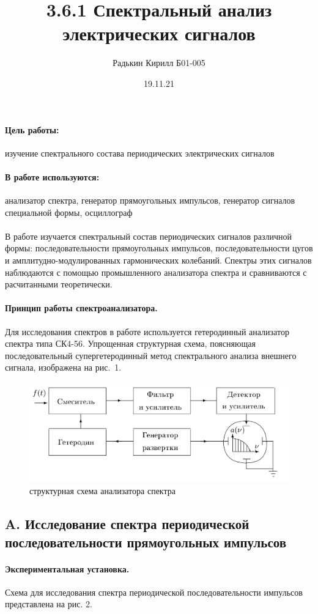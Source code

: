 \documentclass[a4paper, 12pt]{article}
\author{Радькин Кирилл Б01-005}
\title{3.6.1 Спектральный анализ электрических сигналов}
\date{19.11.21}
\newcommand{\parag}[1]{\paragraph*{#1:}}
\newcommand{\mysec}[1]{\begin{center}\section*{#1}\end{center}}
\begin{document}
    \maketitle

    \parag{Цель работы} изучение спектрального состава периодических электрических сигналов

    \parag{В работе используются} анализатор спектра, генератор прямоугольных импульсов, генератор сигналов специальной формы, осциллограф
    \\\\
    В работе изучается спектральный состав периодических сигналов различной формы: последовательности прямоугольных импульсов, последовательности цугов и амплитудно-модулированных гармонических колебаний. Спектры этих сигналов наблюдаются с помощью промышленного анализатора спектра и сравниваются с расчитанными теоретически.

    \paragraph*{Принцип работы спектроанализатора.} 
    Для исследования спектров в работе используется гетеродинный анализатор спектра типа СК4-56. Упрощенная структурная схема, поясняющая последовательный супергетеродинный метод спектрального анализа внешнего сигнала, изображена на рис.~1.

    \begin{figure}[!h]
        \includegraphics[scale=0.3]{pic1.png}
        \caption{структурная схема анализатора спектра}
    \end{figure}

    \mysec{A. Исследование спектра периодической последовательности прямоугольных импульсов}
    
    \paragraph*{Экспериментальная установка.}
    Схема для исследования спектра периодической последовательности импульсов представлена на рис. 2.
\end{document}
